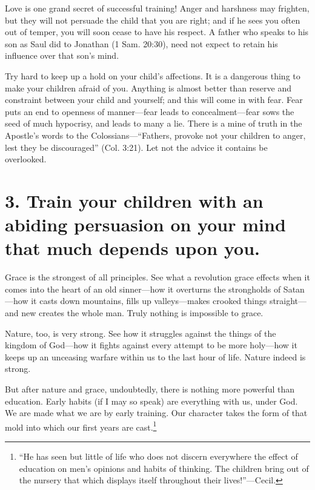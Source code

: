 \documentclass[
]{book}
\begin{document}
Love is one grand secret of successful training! Anger and harshness may frighten, but they will not persuade the child that you are right; and if he sees you often out of temper, you will soon cease to have his respect. A father who speaks to his son as Saul did to Jonathan (1 Sam. 20:30), need not expect to retain his influence over that son's mind.

Try hard to keep up a hold on your child's affections. It is a dangerous thing to make your children afraid of you. Anything is almost better than reserve and constraint between your child and yourself; and this will come in with fear. Fear puts an end to openness of manner---fear leads to concealment---fear sows the seed of much hypocrisy, and leads to many a lie. There is a mine of truth in the Apostle's words to the Colossians---``Fathers, provoke not your children to anger, lest they be discouraged'' (Col. 3:21). Let not the advice it contains be overlooked.

\hypertarget{train-your-children-with-an-abiding-persuasion-on-your-mind-that-much-depends-upon-you.}{%
\section*{3. Train your children with an abiding persuasion on your mind that much depends upon you.}\label{train-your-children-with-an-abiding-persuasion-on-your-mind-that-much-depends-upon-you.}}

Grace is the strongest of all principles. See what a revolution grace effects when it comes into the heart of an old sinner---how it overturns the strongholds of Satan---how it casts down mountains, fills up valleys---makes crooked things straight---and new creates the whole man. Truly nothing is impossible to grace.

Nature, too, is very strong. See how it struggles against the things of the kingdom of God---how it fights against every attempt to be more holy---how it keeps up an unceasing warfare within us to the last hour of life. Nature indeed is strong.

But after nature and grace, undoubtedly, there is nothing more powerful than education. Early habits (if I may so speak) are everything with us, under God. We are made what we are by early training. Our character takes the form of that mold into which our first years are cast.\footnote{``He has seen but little of life who does not discern everywhere the effect of education on men's opinions and habits of thinking. The children bring out of the nursery that which displays itself throughout their lives!''---Cecil.}
\end{document}

